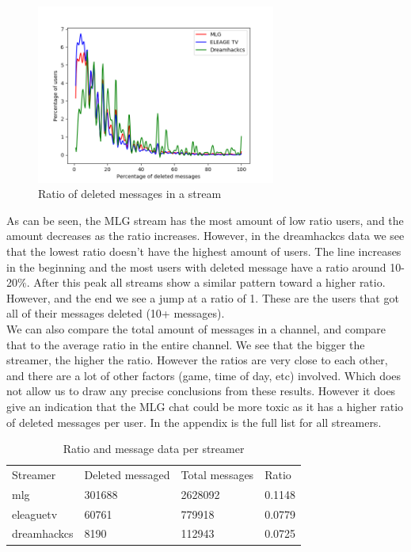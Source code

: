 \documentclass[final]{report}
\begin{document}
\begin{figure}[h]
	\centering
	\includegraphics[width=0.7\textwidth]{DeletedPerStreamer.png}
	\caption{Ratio of deleted messages in a stream}
	\label{fig:deletedPerStream}
\end{figure}

As can be seen, the MLG stream has the most amount of low ratio users, and the amount decreases as the ratio increases. However, in the dreamhackcs data we see that the lowest ratio doesn't have the highest amount of users. The line increases in the beginning and the most users with deleted message have a ratio around 10-20$\%$. After this peak all streams show a similar pattern toward a higher ratio.
However, and the end we see a jump at a ratio of 1. These are the users that got all of their messages deleted (10+ messages).\\

We can also compare the total amount of messages in a channel, and compare that to the average ratio in the entire channel. We see that the bigger the streamer, the higher the ratio. However the ratios are very close to each other, and there are a lot of other factors (game, time of day, etc) involved. Which does not allow us to draw any precise conclusions from these results. However it does give an indication that the MLG chat could be more toxic as it has a higher ratio of deleted messages per user. In the appendix is the full list for all streamers.

\begin{table}[]
\centering
\caption{Ratio and message data per streamer}
\label{my-label}
\begin{tabular}{l|lll}
Streamer 		 & Deleted messaged & Total messages 	& Ratio 	\\
mlg              & 301688 			& 2628092 			& 0.1148   	\\
eleaguetv        & 60761  			& 779918  			& 0.0779   	\\
dreamhackcs      & 8190   			& 112943  			& 0.0725	\\
\end{tabular}
\end{table}
\end{document}
